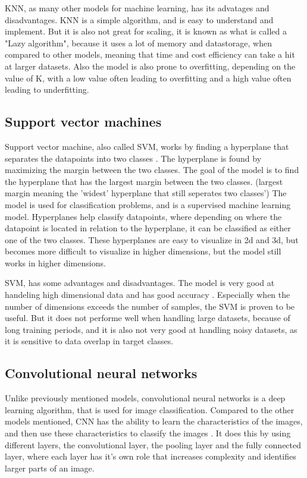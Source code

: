 KNN, as many other models for machine learning, has its advatages and disadvantages. KNN is a simple algorithm, and is easy to understand and implement. But it is also not great for scaling, it is known as what is called a "Lazy algorithm", because it uses a lot of memory and datastorage, when compared to other models, meaning that time and cost efficiency can take a hit at larger datasets\cite{K-NearestNeighborsIBM}. Also the model is also prone to overfitting, depending on the value of K, with a low value often leading to overfitting and a high value often leading to underfitting.

\subsection{Support vector machines}
Support vector machine, also called SVM, works by finding a hyperplane that separates the datapoints into two classes \cite{SupportVectorMachines}. The hyperplane is found by maximizing the margin between the two classes. The goal of the model is to find the hyperplane that has the largest margin between the two classes. (largest margin meaning the 'widest' hyperplane that still seperates two classes') The model is used for classification problems, and is a supervised machine learning model. Hyperplanes help classify datapoints, where depending on where the datapoint is located in relation to the hyperplane, it can be classified as either one of the two classes. These hyperplanes are easy to visualize in 2d and 3d, but becomes more difficult to visualize in higher dimensions, but the model still works in higher dimensions.

SVM, has some advantages and disadvantages. The model is very good at handeling high dimensional data and has good accuracy \cite{SVMProsAndCons}. Especially when the number of dimensions exceeds the number of samples, the SVM is proven to be useful.
But it does not performe well when handling large datasets, because of long training periods, and it is also not very good at handling noisy datasets, as it is sensitive to data overlap in target classes.


\subsection{Convolutional neural networks}
Unlike previously mentioned models, convolutional neural networks is a deep learning algorithm, that is used for image classification. Compared to the other models mentioned, CNN has the ability to learn the characteristics of the images, and then use these characteristics to classify the images \cite{CNNIBM}. It does this by using different layers, the convolutional layer, the pooling layer and the fully connected layer, where each layer has it's own role that increases complexity and identifies larger parts of an image.


